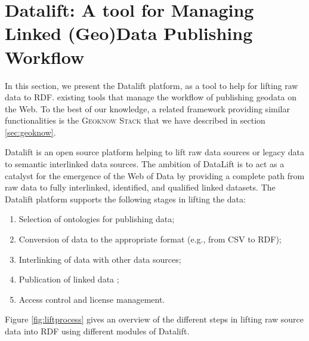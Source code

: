 
\section{Datalift: A tool for Managing Linked (Geo)Data Publishing Workflow}
\label{sec:toolLD}
In this section, we present the Datalift platform, as a tool to help for lifting raw data to RDF. existing tools that manage the workflow of publishing geodata on the Web. To the best of our knowledge, a related framework providing similar functionalities is the \textsc{Geoknow Stack} that we have described in section \ref{sec:geoknow}.


Datalift is an open source platform \cite{scharffe_2012} helping to lift raw data sources or legacy data to semantic interlinked data sources.
The ambition of DataLift is to act as a catalyst for the emergence of the Web of Data by providing a complete path from raw data to fully interlinked, identified, and qualified linked datasets. The Datalift platform supports the following stages in lifting the data:
\begin{enumerate}
\item Selection of ontologies for publishing data;
\item Conversion of data to the appropriate format (e.g., from CSV to RDF);
\item Interlinking of data with other data sources;
\item Publication of linked data ;
\item Access control and license management.
\end{enumerate}

Figure \ref{fig:liftprocess} gives an overview of the different steps in lifting raw source data into RDF using different modules of Datalift.


